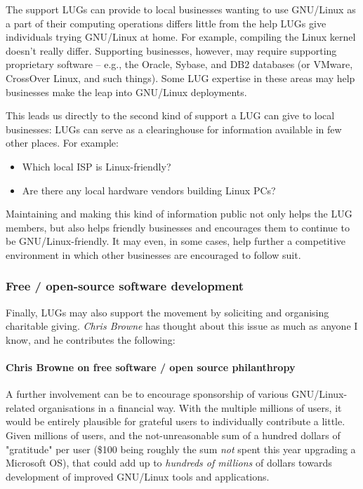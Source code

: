 The support LUGs can provide to local businesses wanting to use GNU/Linux as
a part of their computing operations differs little from the help LUGs
give individuals trying GNU/Linux at home. For example, compiling the Linux
kernel doesn't really differ. Supporting businesses, however, may
require supporting proprietary software -- e.g., the Oracle, Sybase,
and DB2 databases (or VMware, CrossOver Linux, and such things).   
Some LUG expertise in these areas may help businesses make the leap
into GNU/Linux deployments.

This leads us directly to the second kind of support a LUG can give to
local businesses: LUGs can serve as a clearinghouse for information
available in few other places. For example:

\begin{itemize}
\item Which local ISP is Linux-friendly?
\item Are there any local hardware vendors building Linux PCs?
\end{itemize}


Maintaining and making this kind of information public not only helps
the LUG members, but also helps friendly businesses and encourages
them to continue to be GNU/Linux-friendly. It may even, in some cases, help
further a competitive environment in which other businesses are
encouraged to follow suit.

\subsubsection{Free / open-source software development}

Finally, LUGs may also support the movement by soliciting and
organising charitable giving. 
\emph{Chris Browne} \texttt{\adgurl}
 has thought about this issue as much as
anyone I know, and he contributes the following:




\paragraph{Chris Browne on free software / open source philanthropy}

 
A further involvement can be to encourage sponsorship of various
GNU/Linux-related organisations in a financial way.  With the 
multiple millions of users, it would be entirely plausible for grateful 
users to individually contribute a little. Given millions of users, and 
the not-unreasonable sum of a hundred dollars of "gratitude" per user (\$100 being
roughly the sum {\itshape not\/} spent this year upgrading a Microsoft OS),
that could add up to {\itshape hundreds of millions\/} of dollars towards
development of improved GNU/Linux tools and applications.



